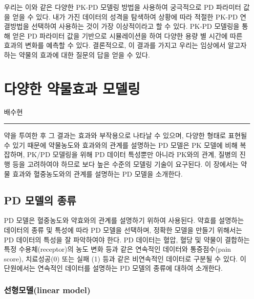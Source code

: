\documentclass[
  11pt,
  krantz2, a4paper, twoside]{krantz}
\theoremstyle{definition}
\theoremstyle{definition}
\theoremstyle{definition}
\theoremstyle{remark}
\begin{document}
우리는 이와 같은 다양한 PK-PD 모델링 방법을 사용하여 궁극적으로 PD 파라미터 값을 얻을 수 있다. 내가 가진 데이터의 성격을 탐색하여 상황에 따라 적절한 PK-PD 연결방법을 선택하여 사용하는 것이 가장 이상적이라고 할 수 있다. PK-PD 모델링을 통해 얻은 PD 파라미터 값을 기반으로 시뮬레이션을 하여 다양한 용량 별 시간에 따른 효과의 변화를 예측할 수 있다. 결론적으로, 이 결과를 가지고 우리는 임상에서 알고자 하는 약물의 효과에 대한 질문의 답을 얻을 수 있다.

\hypertarget{effect-model}{%
\chapter{다양한 약물효과 모델링}\label{effect-model}}

\Large\hfill

배수현
\normalsize

\begin{center}\rule{0.5\linewidth}{0.5pt}\end{center}

약을 투여한 후 그 결과는 효과와 부작용으로 나타날 수 있으며, 다양한 형태로 표현될 수 있기 때문에 약물농도와 효과와의 관계를 설명하는 PD 모델은 PK 모델에 비해 복잡하며, PK/PD 모델링을 위해 PD 데이터 특성뿐만 아니라 PK와의 관계, 질병의 진행 등을 고려하여야 하므로 보다 높은 수준의 모델링 기술이 요구된다. 이 장에서는 약물 효과와 혈중농도와의 관계를 설명하는 PD 모델을 소개한다.

\hypertarget{pd-model}{%
\section{PD 모델의 종류}\label{pd-model}}

PD 모델은 혈중농도와 약효와의 관계를 설명하기 위하여 사용된다. 약효를 설명하는 데이터의 종류 및 특성에 따라 PD 모델을 선택하며, 정확한 모델을 만들기 위해서는 PD 데이터의 특성을 잘 파악하여야 한다. PD 데이터는 혈압, 혈당 및 약물이 결합하는 특정 수용체(receptor)의 농도 변화 등과 같은 연속적인 데이터와 통증점수(pain score), 치료성공(0) 또는 실패 (1) 등과 같은 비연속적인 데이터로 구분될 수 있다. 이 단원에서는 연속적인 데이터를 설명하는 PD 모델의 종류에 대하여 소개한다.

\hypertarget{uxc120uxd615uxbaa8uxb378linear-model}{%
\subsection{선형모델(linear model)}\label{uxc120uxd615uxbaa8uxb378linear-model}}
\end{document}
